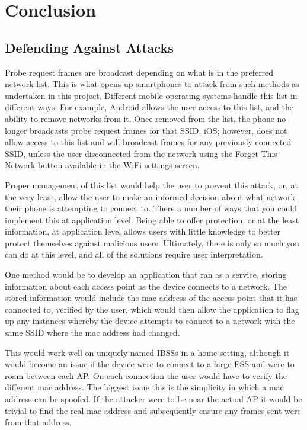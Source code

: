 \section{Conclusion}
\subsection{Defending Against Attacks}
Probe request frames are broadcast depending on what is in the preferred network list. This is what opens up smartphones to attack from such methods as undertaken in this project. Different mobile operating systems handle this list in different ways. For example, Android allows the user access to this list, and the ability to remove networks from it. Once removed from the list, the phone no longer broadcasts probe request frames for that SSID. iOS; however, does not allow access to this list and will broadcast frames for any previously connected SSID, unless the user disconnected from the network using the Forget This Network button available in the WiFi settings screen.

Proper management of this list would help the user to prevent this attack, or, at the very least, allow the user to make an informed decision about what network their phone is attempting to connect to. There a number of ways that you could implement this at application level. Being able to offer protection, or at the least information, at application level allows users with little knowledge to better protect themselves against malicious users. Ultimately, there is only so much you can do at this level, and all of the solutions require user interpretation.

One method would be to develop an application that ran as a service, storing information about each access point as the device connects to a network. The stored information would include the mac address of the access point that it has connected to, verified by the user, which would then allow the application to flag up any instances whereby the  device attempts to connect to a network with the same SSID where the mac address had changed.

This would work well on uniquely named IBSSs in a home setting, although it would become an issue if the device were to connect to a large ESS and were to roam between each AP. On each connection the user would have to verify the different mac address. The biggest issue this  is the simplicity in which a mac address can be spoofed. If the attacker were to be near the actual AP it would be trivial to find the real mac address and subsequently ensure any frames sent were from that address.

